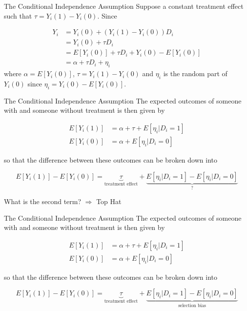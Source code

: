 \documentclass[
  ignorenonframetext,
]{beamer}
\begin{document}
\begin{frame}{The Conditional Independence Assumption}
\protect\hypertarget{the-conditional-independence-assumption}{}
Suppose a constant treatment effect such that \(\tau=Y_i(1)-Y_i(0)\).
Since

\[
\begin{aligned}
Y_i&=Y_i(0)+(Y_i(1)-Y_i(0))D_i\\
&=Y_i(0)+\tau D_i\\
&=E[Y_i(0)]+\tau D_i+Y_i(0)-E[Y_i(0)]\\
&=\alpha+\tau D_i+\eta_i
\end{aligned}
\] where \(\alpha=E[Y_i(0)]\), \(\tau=Y_i(1)-Y_i(0)\) and \(\eta_i\) is
the random part of \(Y_i(0)\) since \(\eta_i=Y_i(0)-E[Y_i(0)]\).
\end{frame}

\begin{frame}{The Conditional Independence Assumption}
\protect\hypertarget{the-conditional-independence-assumption-1}{}
The expected outcomes of someone with and someone without treatment is
then given by

\[
\begin{aligned}
E[Y_i(1)]&=\alpha+\tau+E[\eta_i|D_i=1]\\
E[Y_i(0)]&=\alpha+E[\eta_i|D_i=0]
\end{aligned}
\]

so that the difference between these outcomes can be broken down into

\[
 E[Y_i(1)]-E[Y_i(0)] = 
    \underbrace{\tau}_\text{treatment effect} + \underbrace{E[\eta_i|D_i=1]-E[\eta_i|D_i=0]}_\text{?}
\]

What is the second term? \(\Rightarrow\) Top Hat
\end{frame}

\begin{frame}{The Conditional Independence Assumption}
\protect\hypertarget{the-conditional-independence-assumption-2}{}
The expected outcomes of someone with and someone without treatment is
then given by

\[
\begin{aligned}
E[Y_i(1)]&=\alpha+\tau+E[\eta_i|D_i=1]\\
E[Y_i(0)]&=\alpha+E[\eta_i|D_i=0]
\end{aligned}
\]

so that the difference between these outcomes can be broken down into

\[
 E[Y_i(1)]-E[Y_i(0)] = 
    \underbrace{\tau}_\text{treatment effect} + \underbrace{E[\eta_i|D_i=1]-E[\eta_i|D_i=0]}_\text{selection bias}
\]
\end{frame}
\end{document}
